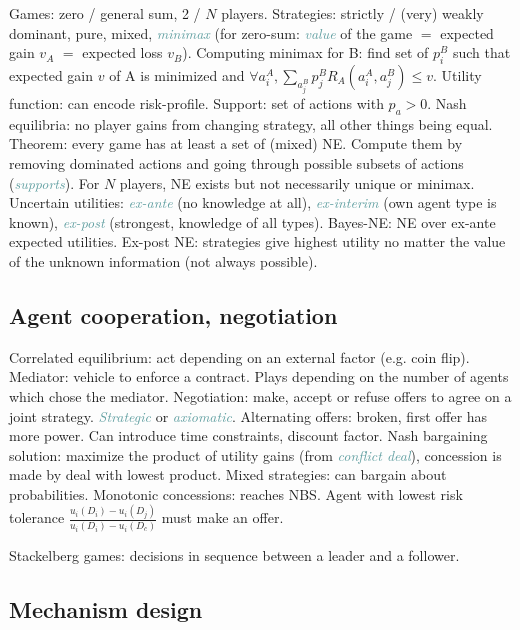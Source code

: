 \documentclass[10pt,a4paper,landscape]{article}
\newcommand{\concept}[1]{\textcolor{Emerald}{#1}} %
\newcommand{\subconcept}[1]{\textcolor{CadetBlue}{\textit{#1}}}
\begin{document}
\begin{multicols*}{4}
\concept{Games}: zero / general sum, 2 / $N$ players.
\concept{Strategies}: strictly / (very) weakly dominant, pure, mixed, \subconcept{minimax} (for zero-sum: \subconcept{value} of the game $=$ expected gain $v_A$ $=$ expected loss $v_B$). Computing minimax for B: find set of $p_i^B$ such that expected gain $v$ of A is minimized and $\forall a_i^A, \sum_{a_j^B} p_j^B R_A(a_i^A, a_j^B) \leq v$.
\concept{Utility function}: can encode risk-profile.
\concept{Support}: set of actions with $p_a > 0$.
\concept{Nash equilibria}: no player gains from changing strategy, all other things being equal. Theorem: every game has at least a set of (mixed) NE. Compute them by removing dominated actions and going through possible subsets of actions (\subconcept{supports}). For $N$ players, NE exists but not necessarily unique or minimax.
\concept{Uncertain utilities}: \subconcept{ex-ante} (no knowledge at all), \subconcept{ex-interim} (own agent type is known), \subconcept{ex-post} (strongest, knowledge of all types).
\concept{Bayes-NE}: NE over ex-ante expected utilities.
\concept{Ex-post NE}: strategies give highest utility no matter the value of the unknown information (not always possible).

\subsection{Agent cooperation, negotiation}

\concept{Correlated equilibrium}: act depending on an external factor (e.g. coin flip).
\concept{Mediator}: vehicle to enforce a contract. Plays depending on the number of agents which chose the mediator.
\concept{Negotiation}: make, accept or refuse offers to agree on a joint strategy. \subconcept{Strategic} or \subconcept{axiomatic}.
\concept{Alternating offers}: broken, first offer has more power. Can introduce time constraints, discount factor.
\concept{Nash bargaining solution}: maximize the product of utility gains (from \subconcept{conflict deal}), concession is made by deal with lowest product. Mixed strategies: can bargain about probabilities.
\concept{Monotonic concessions}: reaches NBS. Agent with lowest risk tolerance $\frac{u_i(D_i) - u_i(D_j)}{u_i(D_i) - u_i(D_c)}$ must make an offer.

\concept{Stackelberg games}: decisions in sequence between a leader and a follower.

\subsection{Mechanism design}


\end{multicols*}
\end{document}
